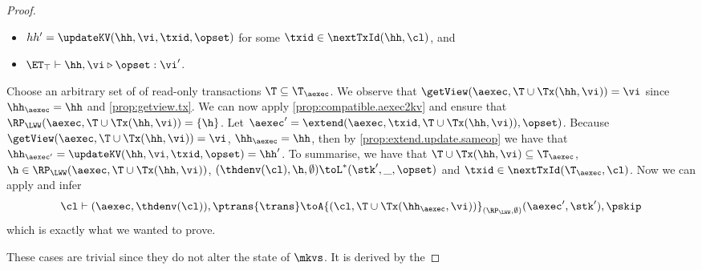 \begin{proof}
\begin{itemize}
\item $hh' = \updateKV(\hh, \vi, \txid, \opset)$ for some $\txid \in \nextTxId(\hh, \cl)$, and
\item $\ET_{\top} \vdash \hh, \vi \triangleright \opset: \vi'$.
\end{itemize}
Choose an arbitrary set of of read-only transactions $\T \subseteq \T_{\aexec}$.
We observe that $\getView(\aexec, \T \cup \Tx(\hh, \vi)) = \vi$ since $\hh_{\aexec} = \hh$ and \cref{prop:getview.tx}.
We can now apply \cref{prop:compatible.aexec2kv} and ensure that $\RP_{\LWW}(\aexec, \T \cup \Tx(\hh, \vi)) = \{\h\}$.
Let $\aexec' = \extend(\aexec, \txid, \T \cup \Tx(\hh, \vi)), \opset)$. 
Because $\getView(\aexec, \T \cup \Tx(\hh, \vi)) = \vi$, $\hh_{\aexec} = \hh$,
then by \cref{prop:extend.update.sameop} we have that $\hh_{\aexec'} = \updateKV(\hh, \vi, \txid, \opset) = \hh'$. 
To summarise, we have that $\T \cup \Tx(\hh, \vi) \subseteq \T_{\aexec}$, $\h \in \RP_{\LWW}(\aexec, \T \cup \Tx(\hh, \vi))$,
$(\thdenv(\cl), \h, \emptyset) \toL^{\ast} (\stk', \_, \opset)$ and $\txid \in \nextTxId(\T_{\aexec}, \cl)$. 
Now we can apply  and infer
\[
\cl \vdash (\aexec, \thdenv(\cl)), \ptrans{\trans} \toA{(\cl, \T \cup \Tx(\hh_{\aexec}, \vi))}_{(\RP_{\LWW}, \emptyset)} 
(\aexec', \stk'), \pskip
\]
which is exactly what we wanted to prove. 

These cases are trivial since they do not alter the state of \( \mkvs \).
It is derived by the \ih
\end{proof}

